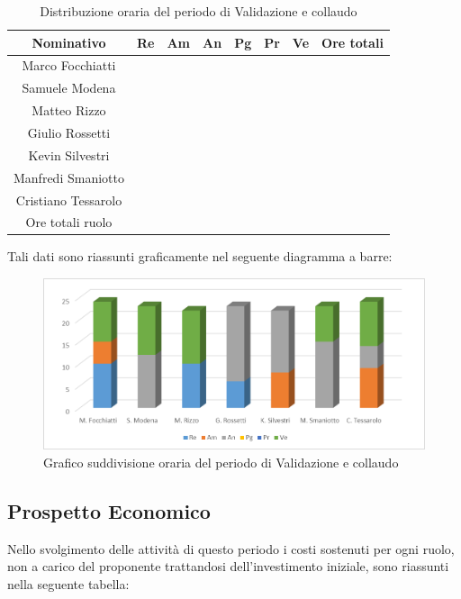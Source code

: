 \documentclass[./PianodiProgetto.tex]{subfiles}
\begin{document}
\begin{table}[H]
	\centering
	\begin{tabular}{|c|cccccc|c|}
		\hline
		Nominativo&Re&Am&An&Pg&Pr&Ve&Ore totali\\ \hline
		Marco Focchiatti& & & & & & & \\ \hline
		Samuele Modena& & & & & & & \\ \hline
		Matteo Rizzo& & & & & & & \\ \hline
		Giulio Rossetti& & & & & & & \\ \hline
		Kevin Silvestri& & & & & & & \\ \hline
		Manfredi Smaniotto& & & & & & & \\ \hline
		Cristiano Tessarolo& & & & & & & \\  \hline
		Ore totali ruolo& & & & & & & \\ \hline
	\end{tabular}
	\caption{Distribuzione oraria del periodo di Validazione e collaudo}
\end{table}

Tali dati sono riassunti graficamente nel seguente diagramma a barre:
\begin{figure}[H]
	\centering
	\includegraphics[width=1\linewidth]{img/grafici/ValidazioneCollaudoProspettoOrario}
	\caption{Grafico suddivisione oraria del periodo di Validazione e collaudo}
	\label{fig:validazione-collaudo-prospetto-orario}
\end{figure}

\subsection{Prospetto Economico}
Nello svolgimento delle attività di questo periodo i costi sostenuti per ogni ruolo, non a carico del proponente trattandosi dell’investimento iniziale, sono riassunti nella seguente tabella:
\end{document}

